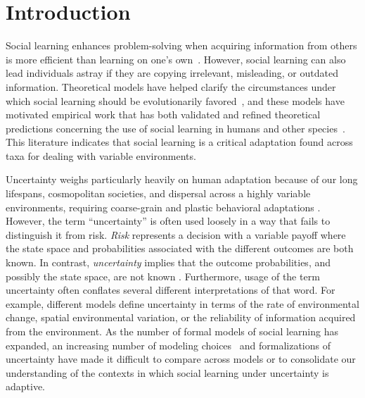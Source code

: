 \documentclass[letterpaper,11.5pt]{scrartcl}
\begin{document}
\section{Introduction}

Social learning enhances problem-solving when acquiring information from others is more efficient than learning on one's own~\citep{Laland2004}. However, social learning can also lead individuals astray if they are copying irrelevant, misleading, or outdated information. Theoretical models have helped clarify the circumstances under which social learning should be evolutionarily favored~\citep{BoydRicherson1985, aoki2014evolution,Kendal2018}, and these models have motivated empirical work that has both validated and refined theoretical predictions concerning the use of social learning in humans and other species~\citep{galef2005social,McElreath2005,Kendal2018,Allen2019}. This literature
indicates that social learning is a critical adaptation found across taxa for dealing
with variable environments. %

Uncertainty weighs particularly heavily on human adaptation because of
our long lifespans, cosmopolitan societies, and dispersal across a highly variable environments, requiring coarse-grain and plastic behavioral adaptations \citep{levins1962}. However, the term ``uncertainty'' is often used loosely in a way that fails to distinguish it from risk. \emph{Risk} represents a decision with a variable payoff where the state space and probabilities associated with the different outcomes are both known. In contrast, \emph{uncertainty} implies that the outcome probabilities, and possibly the state space, are not known \citep{knight1921, keynes1921}. Furthermore, usage of the term uncertainty often conflates several different interpretations of that word. For example, different models define uncertainty in terms of the rate of environmental change, spatial environmental variation, or the reliability of information acquired from the environment. %
As the number of formal models of social learning has expanded, an increasing number of modeling choices~\citep{Kendal2018} and formalizations of
uncertainty have made it difficult to compare across models or to consolidate our
understanding of the contexts in which social learning under uncertainty is adaptive. 
\end{document}
